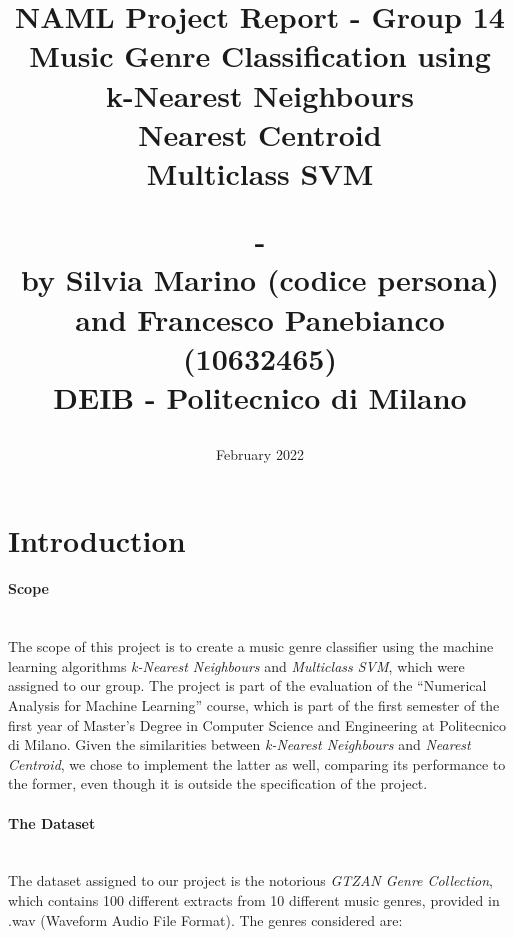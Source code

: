 \documentclass[12pt]{article}
\begin{document}
	\title{NAML Project Report - Group 14\\\vspace{20pt}
		\Large{Music Genre Classification using}\\
		\large{k-Nearest Neighbours\\ Nearest Centroid\\ Multiclass SVM}\\
		\date{February 2022}
		\large{-\\}
		\large{by Silvia Marino (codice persona) and Francesco Panebianco (10632465)\\}
		\small{DEIB - Politecnico di Milano}
	}
	\maketitle
	\tableofcontents
	\newpage
	\section{Introduction}
	\paragraph{Scope}\mbox{}\\\newline
	The scope of this project is to create a music genre classifier using the machine learning algorithms \textit{k-Nearest Neighbours} and \textit{Multiclass SVM}, which were assigned to our group. The project is part of the evaluation of the “Numerical Analysis for Machine Learning” course, which is part of the first semester of the first year of Master’s Degree in Computer Science and Engineering at Politecnico di Milano. Given the similarities between \textit{k-Nearest Neighbours} and \textit{Nearest Centroid}, we chose to implement the latter as well, comparing its performance to the former, even though it is outside the specification of the project.\\ 
	
	\paragraph{The Dataset}\mbox{}\\\newline
	The dataset assigned to our project is the notorious \textit{GTZAN Genre Collection}\cite{marsyas}, which contains 100 different extracts from 10 different music genres, provided in .wav (Waveform Audio File Format). The genres considered are: 
	
\end{document}
